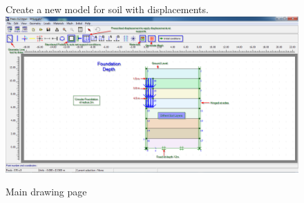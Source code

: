 \begin{landscape}
\begin{figure}[hbtp]
  Create a new model for soil with displacements.
  \centering
  \includegraphics[width=0.9\linewidth, height=0.9\textheight,keepaspectratio]{images/plx/a (4).png}
  \caption{Main drawing page}
\end{figure}
\end{landscape}
\pagebreak

